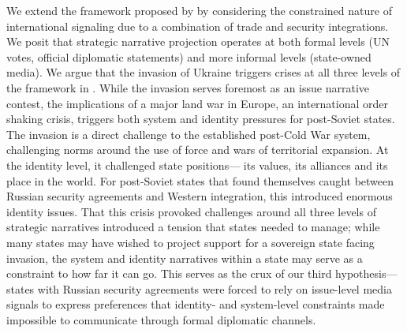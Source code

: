 \documentclass[12pt]{article}
\begin{document}
We extend the framework proposed by \citet{miskimmon_strategic_2013} by considering the constrained nature of international signaling due to a combination of trade and security integrations. We posit that strategic narrative projection operates at both formal levels (UN votes, official diplomatic statements) and more informal levels (state-owned media). We argue that the invasion of Ukraine triggers crises at all three levels of the framework in \citet{miskimmon_strategic_2013}. While the invasion serves foremost as an issue narrative contest, the implications of a major land war in Europe, an international order shaking crisis, triggers both system and identity pressures for post-Soviet states. The invasion is a direct challenge to the established post-Cold War system, challenging norms around the use of force and wars of territorial expansion. At the identity level, it challenged state positions--- its values, its alliances and its place in the world. For post-Soviet states that found themselves caught between Russian security agreements and Western integration, this introduced enormous identity issues. That this crisis provoked challenges around all three levels of strategic narratives introduced a tension that states needed to manage; while many states may have wished to project support for a sovereign state facing invasion, the system and identity narratives within a state may serve as a constraint to how far it can go. This serves as the crux of our third hypothesis--- states with Russian security agreements were forced to rely on issue-level media signals to express preferences that identity- and system-level constraints made impossible to communicate through formal diplomatic channels.


\newpage

\printbibliography

%
%
\end{document}
